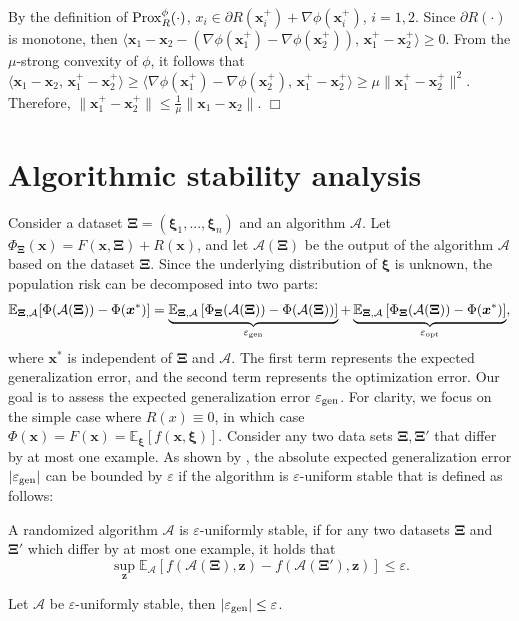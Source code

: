 \documentclass[twoside,11pt]{article}
\newcommand{\E}{\mathbb{E}}
\newcommand{\cA}{\mathcal A}
\def\inprod#1#2{\langle#1,\,#2\rangle}
\def\vx{{\bm{x}}}
\def\vz{{\bm{z}}}
\begin{document}
\medskip
{}
By the definition of ${\rm Prox}_R^\phi(\cdot)$,  $x_i\in\partial R(\vx_i^+)+\nabla\phi(\vx^+_i)$, $i=1,2$. Since $\partial R(\cdot)$ is monotone, then 
 $\inprod{\vx_1-\vx_2-(\nabla\phi(\vx^+_1)-\nabla\phi(\vx^+_2))}{\vx^+_1-\vx^+_2}\geq0$. From the $\mu$-strong convexity of $\phi$, it follows that $\inprod{\vx_1-\vx_2}{\vx^+_1-\vx^+_2}\geq\inprod{\nabla\phi(\vx^+_1)-\nabla\phi(\vx^+_2)}{\vx^+_1-\vx^+_2}\geq\mu\|\vx^+_1-\vx^+_2\|^2$. Therefore, $\|\vx^+_1-\vx^+_2\|\leq\frac{1}{\mu}\|\vx_1-\vx_2\|$. $\Box$


\section{Algorithmic stability analysis}
{Consider a dataset $\bm\Xi=(\bm\xi_1,...,\bm\xi_n)$ and an algorithm $\cA$. Let $\Phi_{\bm\Xi}(\vx)=F(\vx,\bm\Xi)+R(\vx)$, and let $\cA(\bm\Xi)$ be the output of the algorithm $\cA$ based on the dataset $\bm\Xi$. Since the underlying distribution of $\bm\xi$ is unknown, the population risk can be decomposed into two parts:
 \[
 \E_{\bm\Xi,\cA}[\Phi(\cA(\bm\Xi))-\Phi(\vx^*)]=\underbrace{\E_{\bm\Xi,\cA}\left[\Phi_{\bm\Xi}(\cA(\bm\Xi))-\Phi(\cA(\bm\Xi))\right]}_{\varepsilon_{\rm gen}}+\underbrace{\E_{\bm\Xi,\cA}\left[\Phi_{\bm\Xi}(\cA(\bm\Xi))-\Phi(\vx^*)\right]}_{\varepsilon_{\rm opt}},
 \]
 where $\vx^*$ is independent of $\bm\Xi$ and $\cA$. The first term represents the expected generalization error, and the second term represents the optimization error. Our goal is to assess the expected generalization error $\varepsilon_{\rm gen}$. For clarity, we focus on the simple case where $R(x)\equiv0$, in which case $\Phi(\vx)=F(\vx)=\E_{\bm\xi}[f(\vx,\bm\xi)]$. Consider any two data sets $\bm\Xi,\bm\Xi'$ that differ by at most one example. As shown by \citep{bousquet2002stability,shalev2010learnability,hardt2016train}, the absolute expected generalization error $|\varepsilon_{\rm gen}|$ can be bounded by $\varepsilon$ if the algorithm is $\varepsilon$-uniform stable that is defined as follows:
\begin{definition}
A randomized algorithm $\cA$ is $\varepsilon$-uniformly stable, if for any two datasets $\bm\Xi$ and $\bm\Xi'$ which differ by at most one example, it holds that
\[
\sup_{\vz}\E_{\cA}[f(\cA(\bm\Xi),\vz)-f(\cA(\bm\Xi'),\vz)]\leq\varepsilon.
\]
\end{definition} 
\begin{lemma}
\label{le:general-stability}
Let $\cA$ be $\varepsilon$-uniformly stable, then $|\varepsilon_{\rm gen}|\leq\varepsilon$.
\end{lemma}

}
\end{document}
